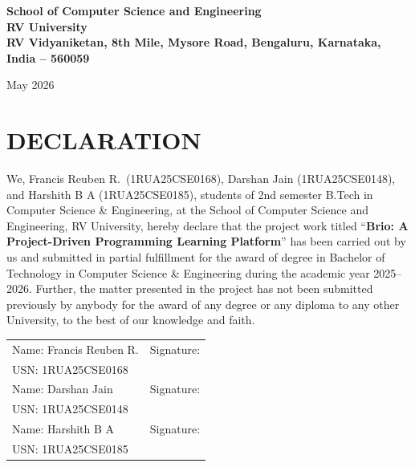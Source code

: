 \documentclass[12pt,a4paper]{article}
\begin{document}
\begin{titlepage}
    \vspace{0.5cm}

    {\large\bfseries School of Computer Science and Engineering\\
    RV University\\
    RV Vidyaniketan, 8th Mile, Mysore Road, Bengaluru, Karnataka,\\
    India -- 560059\par}

    \vspace{0.4cm}

    {\large May 2026\par}

\end{titlepage}


\newpage
\section*{DECLARATION}

We, Francis Reuben R.\ (1RUA25CSE0168), Darshan Jain (1RUA25CSE0148), and Harshith B A
(1RUA25CSE0185), students of 2nd semester B.Tech in Computer Science \& Engineering, at the
School of Computer Science and Engineering, RV University, hereby declare that the project work
titled ``\textbf{Brio: A Project-Driven Programming Learning Platform}'' has been carried out by
us and submitted in partial fulfillment for the award of degree in Bachelor of Technology in
Computer Science \& Engineering during the academic year 2025--2026. Further, the matter presented
in the project has not been submitted previously by anybody for the award of any degree or any
diploma to any other University, to the best of our knowledge and faith.

\vspace{2cm}

\begin{tabular}{ll}
Name: Francis Reuben R.  & Signature: \underline{\hspace{5cm}} \\
USN: 1RUA25CSE0168       & \\[0.6em]
Name: Darshan Jain       & Signature: \underline{\hspace{5cm}} \\
USN: 1RUA25CSE0148       & \\[0.6em]
Name: Harshith B A       & Signature: \underline{\hspace{5cm}} \\
USN: 1RUA25CSE0185       & \\
\end{tabular}
\end{document}
